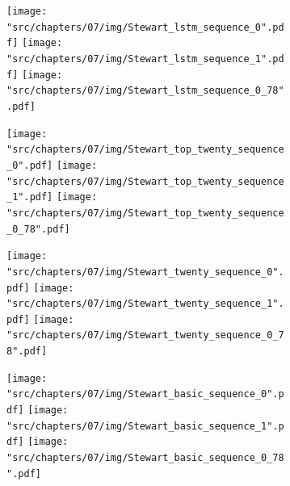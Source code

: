 \begin{figure}[!htbp]
    \begin{subfigure}{\textwidth}
        \texttt{[image: "src/chapters/07/img/Stewart\_lstm\_sequence\_0".pdf]}
        \texttt{[image: "src/chapters/07/img/Stewart\_lstm\_sequence\_1".pdf]}
        \texttt{[image: "src/chapters/07/img/Stewart\_lstm\_sequence\_0\_78".pdf]}
    \end{subfigure}
    \begin{subfigure}{\textwidth}
        \texttt{[image: "src/chapters/07/img/Stewart\_top\_twenty\_sequence\_0".pdf]}
        \texttt{[image: "src/chapters/07/img/Stewart\_top\_twenty\_sequence\_1".pdf]}
        \texttt{[image: "src/chapters/07/img/Stewart\_top\_twenty\_sequence\_0\_78".pdf]}
    \end{subfigure}
    \begin{subfigure}{\textwidth}
        \texttt{[image: "src/chapters/07/img/Stewart\_twenty\_sequence\_0".pdf]}
        \texttt{[image: "src/chapters/07/img/Stewart\_twenty\_sequence\_1".pdf]}
        \texttt{[image: "src/chapters/07/img/Stewart\_twenty\_sequence\_0\_78".pdf]}
    \end{subfigure}
    \begin{subfigure}{\textwidth}
        \texttt{[image: "src/chapters/07/img/Stewart\_basic\_sequence\_0".pdf]}
        \texttt{[image: "src/chapters/07/img/Stewart\_basic\_sequence\_1".pdf]}
        \texttt{[image: "src/chapters/07/img/Stewart\_basic\_sequence\_0\_78".pdf]}
    \end{subfigure}
\end{figure}

